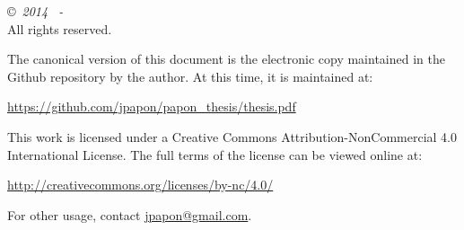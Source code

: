 \newpage \thispagestyle{empty} \vspace*{\fill}
 
\noindent 
\begin{textsc}
\copyright~\textit{2014 \hspace{3pt}~- \theauthor} \\ 
\noindent All rights reserved.
\end{textsc}
\textsc{  }
\begin{flushleft}
The canonical version of this document is the electronic copy maintained in the Github repository by the author. At this time, it is maintained at:\
\end{flushleft}
\begin{center} \url{https://github.com/jpapon/papon_thesis/thesis.pdf} \\ \end{center}

\begin{flushleft}
This work is licensed under a Creative Commons Attribution-NonCommercial 4.0 International License. The full terms of the license can be viewed online at:\
\end{flushleft}
\begin{center} \url{http://creativecommons.org/licenses/by-nc/4.0/} \\ \end{center}

\begin{center} For other usage, contact \url{jpapon@gmail.com}. \end{center}